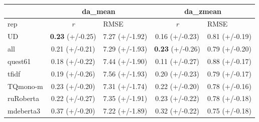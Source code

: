 \begin{table}[H]
	\centering
	\begin{tabular}{l|cl|cl}
		\toprule
		& \multicolumn{2}{c|}{da\_mean} & \multicolumn{2}{c}{da\_zmean} \\
		\midrule
		rep             & \textit{r}         & RMSE & \textit{r}          & RMSE \\
		\midrule
            UD        & \textbf{0.23} (+/-0.25) & 7.27 (+/-1.92) & 0.16 (+/-0.23) & 0.81 (+/-0.19) \\
			all       & 0.21 (+/-0.21) & 7.29 (+/-1.93) & \textbf{0.23} (+/-0.26) & 0.79 (+/-0.20) \\
			quest61   & 0.18 (+/-0.22) & 7.44 (+/-1.90) & 0.11 (+/-0.27) & 0.88 (+/-0.17) \\
			\midrule
			tfidf     & 0.19 (+/-0.26) & 7.56 (+/-1.93) & 0.20 (+/-0.23) & 0.79 (+/-0.17) \\
			TQmono-m  & 0.23 (+/-0.20) & 7.31 (+/-1.74) & 0.22 (+/-0.20) & 0.78 (+/-0.16) \\
			ruRoberta & 0.22 (+/-0.27) & 7.35 (+/-1.91) & 0.23 (+/-0.22) & 0.78 (+/-0.18) \\
			mdeberta3 & \boxit{0.3in}0.37 (+/-0.20) & 7.22 (+/-1.89) & \boxit{0.3in}0.32 (+/-0.22) & 0.75 (+/-0.18) \\

\end{tabular}
\end{table}
